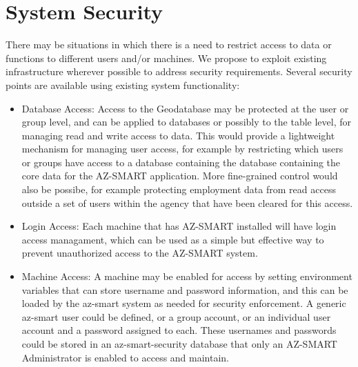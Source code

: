 \section{System Security}
There may be situations in which there is a need to restrict access to data or functions to different users and/or machines.  We propose to exploit existing infrastructure wherever possible to address security requirements.  Several security points are available using existing system functionality:


\begin{itemize}
\item Database Access: Access to the Geodatabase may be protected at the user or group level, and can be applied to databases or possibly to the table level, for managing read and write access to data.  This would provide a lightweight mechanism for managing user access, for example by restricting which users or groups have access to a database containing the database containing the core data for the AZ-SMART application.  More fine-grained control would also be possibe, for example protecting employment data from read access outside a set of users within the agency that have been cleared for this access.

\item Login Access: Each machine that has AZ-SMART installed will have login access managament, which can be used as a simple but effective way to prevent unauthorized access to the AZ-SMART system.

\item Machine Access: A machine may be enabled for access by setting environment variables that can store username and password information, and this can be loaded by the az-smart system as needed for security enforcement.  A generic az-smart user could be defined, or a group account, or an individual user account and a password assigned to each.  These usernames and passwords could be stored in an az-smart-security database that only an AZ-SMART Administrator is enabled to access and maintain.

\end{itemize}

